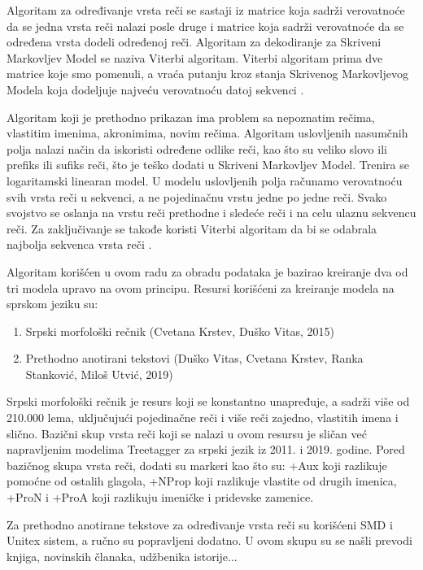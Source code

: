 \documentclass[12pt,oneside]{memoir}
\begin{document}
Algoritam za određivanje vrsta reči se sastaji iz matrice koja sadrži verovatnoće da se jedna vrsta reči nalazi posle druge i matrice koja sadrži verovatnoće da se određena vrsta dodeli određenoj reči. Algoritam za dekodiranje za Skriveni Markovljev Model se naziva Viterbi algoritam.  Viterbi algoritam prima dve matrice koje smo pomenuli, a vraća putanju kroz stanja Skrivenog Markovljevog Modela koja dodeljuje najveću verovatnoću datoj sekvenci \cite{postagging}.

Algoritam koji je prethodno prikazan ima problem sa nepoznatim rečima, vlastitim imenima, akronimima, novim rečima. Algoritam uslovljenih nasumčnih polja nalazi način da iskoristi određene odlike reči, kao što su veliko slovo ili prefiks ili sufiks reči, što je teško dodati u Skriveni Markovljev Model. Trenira se logaritamski linearan model. U modelu uslovljenih polja računamo verovatnoću svih vrsta reči u sekvenci, a ne pojedinačnu vrstu jedne po jedne reči. Svako svojstvo se oslanja na vrstu reči prethodne i sledeće reči i na celu ulaznu sekvencu reči. Za zaključivanje se takođe koristi Viterbi algoritam da bi se odabrala najbolja sekvenca vrsta reči \cite{postagging}.

Algoritam korišćen u ovom radu za obradu podataka je bazirao kreiranje dva od tri modela upravo na ovom principu. Resursi korišćeni za kreiranje modela na sprskom jeziku su:

\begin{enumerate}
\item Srpski morfološki rečnik (Cvetana Krstev, Duško Vitas, 2015)
\item Prethodno anotirani tekstovi (Duško Vitas, Cvetana Krstev, Ranka Stanković, Miloš Utvić, 2019)
\end{enumerate}

Srpski morfološki rečnik je resurs koji se konstantno unapređuje, a sadrži više od 210.000 lema, uključujući pojedinačne reči i više reči zajedno, vlastitih imena i slično. Bazični skup vrsta reči koji se nalazi u ovom resursu je sličan već napravljenim modelima Treetagger za srpski jezik iz 2011. i 2019. godine.  Pored bazičnog skupa vrsta reči, dodati su markeri kao što su: +Aux koji razlikuje pomoćne od ostalih glagola, +NProp koji razlikuje vlastite od drugih imenica, +ProN i +ProA koji razlikuju imeničke i pridevske zamenice.

Za prethodno anotirane tekstove za određivanje vrsta reči su korišćeni SMD i Unitex sistem, a ručno su popravljeni dodatno. U ovom skupu su se našli prevodi knjiga, novinskih članaka, udžbenika istorije...
\end{document}
